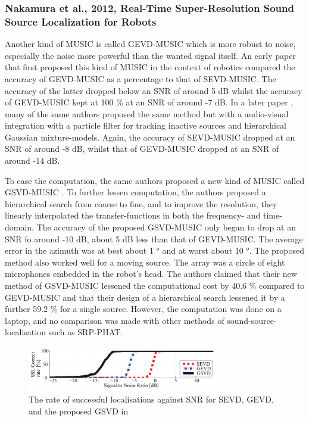 \documentclass[notitlepage]{report}
\begin{document}
\subsubsection{Nakamura et al., 2012, Real-Time Super-Resolution Sound Source Localization for Robots}

Another kind of MUSIC is called GEVD-MUSIC which is more robust to noise, especially the noise more powerful than the wanted signal itself. An early paper \cite{nakamura_intelligent_2009} that first proposed this kind of MUSIC in the context of robotics compared the accuracy of GEVD-MUSIC as a percentage to that of SEVD-MUSIC. The accuracy of the latter dropped below an SNR of around 5 \si{dB} whilst the accuracy of GEVD-MUSIC kept at 100 \% at an SNR of around -7 \si{dB}. In a later paper \cite{nakamura_intelligent_2011}, many of the same authors proposed the same method but with a audio-visual integration with a particle filter for tracking inactive sources and hierarchical Gaussian mixture-models. Again, the accuracy of SEVD-MUSIC dropped at an SNR of around -8 \si{dB}, whilst that of GEVD-MUSIC dropped at an SNR of around -14 \si{dB}. 

To ease the computation, the same authors proposed a new kind of MUSIC called GSVD-MUSIC \cite{nakamura_real-time_2012}. To further lessen computation, the authors proposed a hierarchical search from coarse to fine, and to improve the resolution, they linearly interpolated the transfer-functions in both the frequency- and time-domain. The accuracy of the proposed GSVD-MUSIC only began to drop at an SNR fo around -10 \si{dB}, about 5 \si{dB} less than that of GEVD-MUSIC. The average error in the azimuth was at best about 1 \si{\degree} and at worst about 10 \si{\degree}. The proposed method also worked well for a moving source. The array was a circle of eight microphones embedded in the robot's head. The authors claimed that their new method of GSVD-MUSIC lessened the computational cost by 40.6 \% compared to GEVD-MUSIC and that their design of a hierarchical search lessened it by a further 59.2 \% for a single source. However, the computation was done on a laptop, and no comparison was made with other methods of sound-source-localisation such as SRP-PHAT.

\begin{figure}[H]
\includegraphics[width=0.75\textwidth]{./nakamura_2012/rate_SNR.png}
\centering
\caption{The rate of successful localisations against SNR for SEVD, GEVD, and the proposed GSVD in \cite{nakamura_real-time_2012}}
\label{fig:nakamura_2012_rate_SNR}
\centering
\end{figure}
\end{document}
